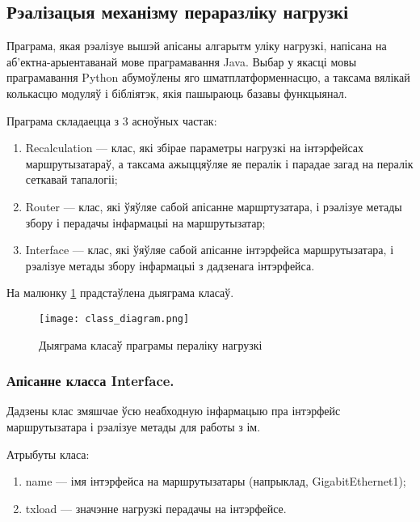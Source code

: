 \subsection{Рэалізацыя механізму пераразліку нагрузкі}

Праграма, якая рэалізуе вышэй апісаны алгарытм уліку нагрузкі, напісана
на аб'ектна-арыентаванай мове праграмавання Java. Выбар у якасці мовы праграмавання
Python абумоўлены яго шматплатформеннасцю, а таксама вялікай колькасцю модуляў і бібліятэк, якія пашыраюць базавы функцыянал.

Праграма складаецца з 3 асноўных частак:
\begin{enumerate}
    \item Recalculation --- клас, які збірае параметры нагрузкі на інтэрфейсах
    маршрутызатараў, а таксама ажыццяўляе яе пералік і парадае загад на
    пералік сеткавай тапалогіі;
    \item Router --- клас, які ўяўляе сабой апісанне маршртузатара, і рэалізуе
    метады збору і перадачы інфармацыі на маршрутызатар;
    \item Interface --- клас, які ўяўляе сабой апісанне інтэрфейса маршрутызатара,
    і рэалізуе метады збору інфармацыі з дадзенага інтэрфейса.
\end{enumerate}

На малюнку \ref{uml: Class Diagram} прадстаўлена дыяграма класаў.

\clearpage

\begin{figure}[ht!]
    \centering
    \texttt{[image: class\_diagram.png]}
    \caption{Дыяграма класаў праграмы пераліку нагрузкі}
    \label{uml: Class Diagram}
\end{figure}

\subsubsection{Апісанне класса Interface.}

Дадзены клас змяшчае ўсю неабходную інфармацыю пра інтэрфейс маршрутызатара і
рэалізуе метады для работы з ім.

Атрыбуты класа:
\begin{enumerate}
    \item name --- імя інтэрфейса на маршрутызатары (напрыклад, GigabitEthernet1);
    \item txload --- значэнне нагрузкі перадачы на інтэрфейсе.
\end{enumerate}

